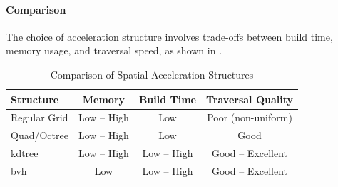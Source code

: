 \paragraph{Comparison}\label{par:comparison}

The choice of acceleration structure involves trade-offs between build time, memory usage, and traversal speed,
as shown in .

\begin{table}[h]
    \centering
    \caption{Comparison of Spatial Acceleration Structures\cite{tuwien_rendering_2020}}
    \label{tab:comparison-of-as}
    \begin{tabular}{lccc}
        \toprule
        \textbf{Structure} & \textbf{Memory} & \textbf{Build Time} & \textbf{Traversal Quality} \\
        \midrule
        Regular Grid & Low -- High & Low & Poor (non-uniform) \\
        Quad/Octree & Low -- High & Low & Good \\
        \gls{kdtree} & Low -- High & Low -- High & Good -- Excellent \\
        \gls{bvh} & Low & Low -- High & Good -- Excellent \\
        \bottomrule
    \end{tabular}
\end{table}
